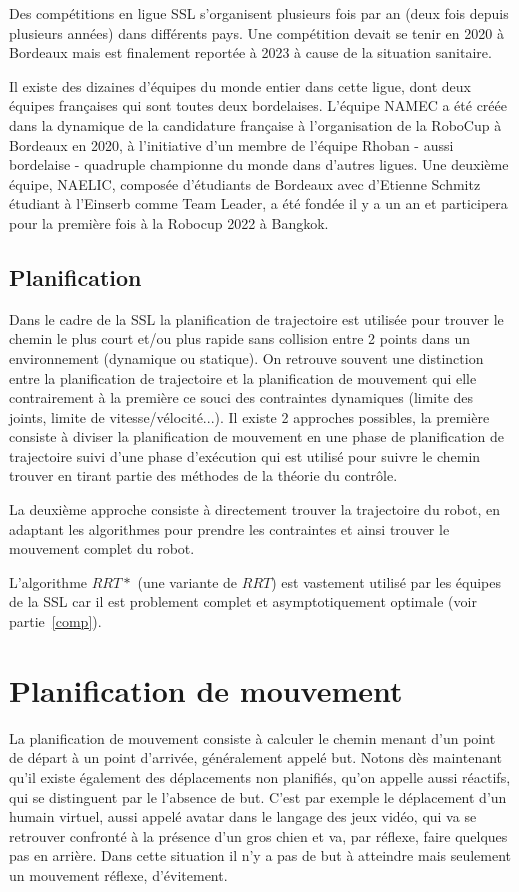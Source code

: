 \documentclass{article}
\begin{document}
Des compétitions en ligue SSL s’organisent plusieurs fois par an (deux fois depuis plusieurs années) dans différents pays. Une compétition devait se tenir en 2020 à Bordeaux mais est finalement reportée à 2023 à cause de la situation sanitaire. 

Il existe des dizaines d’équipes du monde entier dans cette ligue, dont deux équipes françaises qui sont toutes deux bordelaises. L’équipe NAMEC a été créée dans la dynamique de la candidature française à l’organisation de la RoboCup à Bordeaux en 2020, à l’initiative d’un membre de l’équipe Rhoban - aussi bordelaise - quadruple championne du monde dans d’autres ligues. Une deuxième équipe, NAELIC, composée d’étudiants de Bordeaux avec d’Etienne Schmitz étudiant à l’Einserb comme Team Leader, a été fondée il y a un an et participera pour la première fois à la Robocup 2022 à Bangkok.

\subsection{Planification}
Dans le cadre de la SSL la planification de trajectoire est utilisée pour trouver le chemin le plus court et/ou plus rapide sans collision entre 2 points dans un environnement (dynamique ou statique). On retrouve  souvent une distinction entre la planification de trajectoire et la planification de mouvement qui elle contrairement à la première ce souci des  contraintes dynamiques (limite des joints, limite de vitesse/vélocité...). 
Il existe 2 approches possibles, la première consiste à diviser la planification de mouvement  en une phase de planification de trajectoire suivi d’une phase d'exécution qui est utilisé pour suivre le chemin trouver en tirant partie des méthodes de la théorie du contrôle.

La deuxième approche consiste à directement trouver la trajectoire du robot, en adaptant les algorithmes pour prendre les contraintes et ainsi trouver le mouvement complet du robot. 

L’algorithme $RRT*$ (une variante de $RRT$) est vastement utilisé par les équipes de la SSL car il est problement complet et asymptotiquement optimale (voir partie~\ref{comp}).

\section{Planification de mouvement}
La planification de mouvement consiste à calculer le chemin menant d’un point de départ à un point d’arrivée, généralement appelé but. Notons dès maintenant qu’il existe également des déplacements non planifiés, qu’on appelle aussi réactifs, qui se distinguent par le l’absence de but. C’est par exemple le déplacement d’un humain virtuel, aussi appelé avatar dans le langage des jeux vidéo, qui va se retrouver confronté à la présence d’un gros chien et va, par réflexe, faire quelques pas en arrière. Dans cette situation il n’y a pas de but à atteindre mais seulement un mouvement réflexe, d’évitement.
\end{document}
